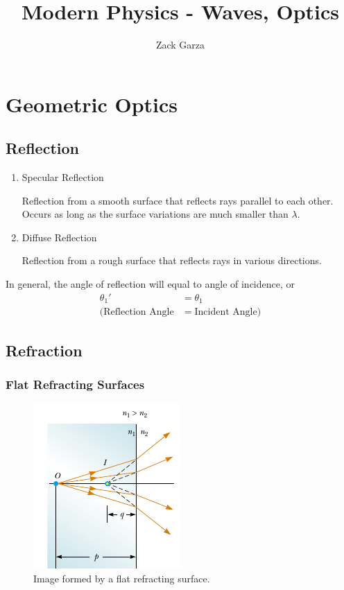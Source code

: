 \documentclass[a4paper,10pt]{report}
\begin{document}
\title{Modern Physics - Waves, Optics}
\author{Zack Garza}
\maketitle
\tableofcontents

\chapter{Geometric Optics}
\section{Reflection}
\begin{enumerate}
 \item Specular Reflection

 Reflection from a smooth surface that reflects rays parallel to each other. Occurs as long as the surface variations are much smaller than $\lambda$.

 \item Diffuse Reflection

 Reflection from a rough surface that reflects rays in various directions.

\end{enumerate}

In general, the angle of reflection will equal to angle of incidence, or
\begin{align*}
 \theta_{1}' &= \theta_1 \\
 (\text{Reflection Angle} &= \text{Incident Angle})
\end{align*}


\section{Refraction}
\subsection{Flat Refracting Surfaces}

\begin{figure}[h!]
  \begin{centering}
  \begin{center}
  \includegraphics{./Images/flat_refracting.png}
  \caption{Image formed by a flat refracting surface.}
  \label{fig:flat_refracting}
  \end{center}
  \par\end{centering}
  \end{figure}
\end{document}
